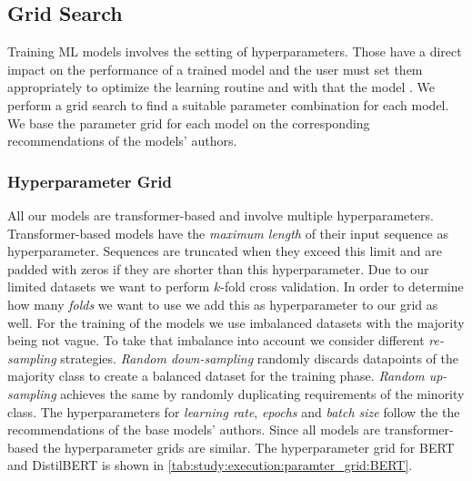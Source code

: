 
\subsection{Grid Search}
\label{chp:study:sec:execution:subsec:gridsearch}
Training \ac{ML} models involves the setting of hyperparameters.
Those have a direct impact on the performance of a trained model and the user must set them appropriately to optimize the learning routine and with that the model \parencite{Claesen:2015}.
We perform a grid search to find a suitable parameter combination for each model.
We base the parameter grid for each model on the corresponding recommendations of the models' authors.

\subsubsection{Hyperparameter Grid}
\label{chp:study:sec:execution:subsec:gridsearch:hyperparameter_grid}
All our models are transformer-based and involve multiple hyperparameters.
Transformer-based models have the \textit{maximum length} of their input sequence as hyperparameter.
Sequences are truncated when they exceed this limit and are padded with zeros if they are shorter than this hyperparameter.
Due to our limited datasets we want to perform $k$-fold cross validation.
In order to determine how many \textit{folds} we want to use we add this as hyperparameter to our grid as well.
For the training of the models we use imbalanced datasets with the majority being not vague.
To take that imbalance into account we consider different \textit{re-sampling} strategies.
\textit{Random down-sampling} randomly discards datapoints of the majority class to create a balanced dataset for the training phase.
\textit{Random up-sampling} achieves the same by randomly duplicating requirements of the minority class.
The hyperparameters for \textit{learning rate}, \textit{epochs} and \textit{batch size} follow the the recommendations of the base models' authors.
Since all models are transformer-based the hyperparameter grids are similar.
The hyperparameter grid for \ac{BERT} and \ac{DistilBERT} is shown in \cref{tab:study:execution:paramter_grid:BERT}.
